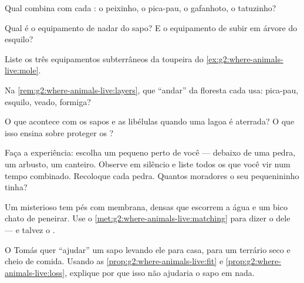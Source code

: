 \begin{exercise}[$\star$]\label{exo:g2:where-animals-live:3}
Qual  combina com cada : o peixinho, o pica-pau, o
gafanhoto, o tatuzinho?
\end{exercise}

\begin{exercise}[$\star$]\label{exo:g2:where-animals-live:4}
Qual é o equipamento de nadar do sapo? E o equipamento de subir em
árvore do esquilo?
\end{exercise}

\begin{exercise}[$\star$]\label{exo:g2:where-animals-live:5}
Liste os três equipamentos subterrâneos da toupeira do
\cref{ex:g2:where-animals-live:mole}.
\end{exercise}

\begin{exercise}[$\star$]\label{exo:g2:where-animals-live:6}
Na \cref{rem:g2:where-animals-live:layers}, que ``andar'' da
floresta cada  usa: pica-pau, esquilo, veado, formiga?
\end{exercise}

\begin{exercise}[$\star$]\label{exo:g2:where-animals-live:7}
O que acontece com os sapos e as libélulas quando uma lagoa é
aterrada? O que isso ensina sobre proteger os ?
\end{exercise}

\begin{exercise}[$\star$]\label{exo:g2:where-animals-live:8}
Faça a experiência: escolha um  pequeno perto de você ---
debaixo de uma pedra, um arbusto, um canteiro. Observe em silêncio e
liste todos os  que você vir num tempo combinado. Recoloque
cada pedra. Quantos moradores o seu  pequenininho tinha?
\end{exercise}

\begin{exercise}[$\star\star$]\label{exo:g2:where-animals-live:9}
Um  misterioso tem pés com membrana,  densas que escorrem
a água e um bico chato de peneirar. Use o
\cref{met:g2:where-animals-live:matching} para dizer o  dele
--- e talvez o .
\end{exercise}

\begin{exercise}[$\star\star$]\label{exo:g2:where-animals-live:10}
O Tomás quer ``ajudar'' um sapo levando ele para casa, para um
terrário seco e cheio de comida. Usando as
\cref{prop:g2:where-animals-live:fit} e
\cref{prop:g2:where-animals-live:loss}, explique por que isso não
ajudaria o sapo em nada.
\end{exercise}
